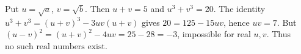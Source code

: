 Put $u=\sqrt a$, $v=\sqrt b$. Then $u+v=5$ and $u^3+v^3=20$. The identity $u^3+v^3=(u+v)^3-3uv(u+v)$ gives $20=125-15uv$, hence $uv=7$. But $(u-v)^2=(u+v)^2-4uv=25-28=-3$, impossible for real $u,v$. Thus $\boxed{\text{no such real numbers exist}}$.
